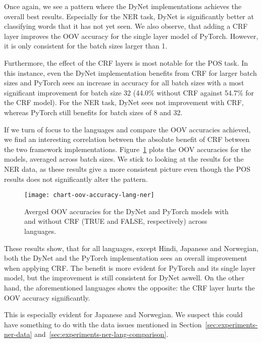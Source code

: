 Once again, we see a pattern where the DyNet implementations achieves the
overall best results. Especially for the NER task, DyNet is significantly
better at classifying words that it has not yet seen. We also observe, that
adding a CRF layer improves the OOV accuracy for the single layer model of
PyTorch. However, it is only consistent for the batch sizes larger than 1.

Furthermore, the effect of the CRF layers is most notable for the POS task.
In this instance, even the DyNet implementation benefits from CRF for larger
batch sizes and PyTorch sees an increase in accuracy for all batch sizes with a
most significant improvement for batch size 32 (44.0\% without CRF against
54.7\% for the CRF model). For the NER task, DyNet sees not improvement with
CRF, whereas PyTorch still benefits for batch sizes of 8 and 32.

If we turn of focus to the languages and compare the OOV accuracies achieved, we
find an interesting correlation between the absolute benefit of CRF between the
two framework implementations. Figure~\ref{chart:oov-accuracy-lang-ner} plots
the OOV accuracies for the models, averaged across batch sizes. We stick to
looking at the results for the NER data, as these results give a more consistent
picture even though the POS results does not significantly alter the pattern.

\begin{figure}[h!]
    \texttt{[image: chart-oov-accuracy-lang-ner]}
    \caption{Averged OOV accuracies for the DyNet and PyTorch models with and
        without CRF (TRUE and FALSE, respectively) across languages.
    }\label{chart:oov-accuracy-lang-ner}
\end{figure}

These results show, that for all languages, except Hindi, Japanese and
Norwegian, both the DyNet and the PyTorch implementation sees an overall
improvement when applying CRF. The benefit is more evident for PyTorch and its
single layer model, but the improvement is still consistent for DyNet aswell. On
the other hand, the aforementioned languages shows the opposite: the CRF layer
hurts the OOV accuracy significantly.

This is especially evident for Japanese and Norwegian. We suspect this could
have something to do with the data issues mentioned in
Section~\ref{sec:experiments-ner-data}
and~\ref{sec:experiments-ner-lang-comparison}.

\pagebreak
